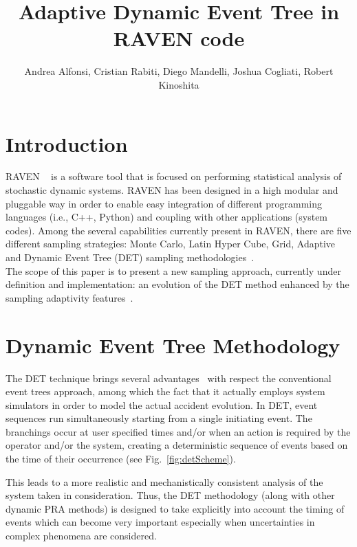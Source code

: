 \documentclass{anstrans}
\title{Adaptive Dynamic Event Tree in RAVEN code}
\author{Andrea Alfonsi, Cristian Rabiti, Diego Mandelli, Joshua Cogliati, Robert Kinoshita}
\institute{Idaho National Laboratory, 2525 Fremont Avenue, Idaho Falls, ID 83402, United States}
\begin{document}
\section{Introduction}

RAVEN ~\cite{ravenFY12,alfonsiMC,alfonsiESREL2014} is a software tool that is focused on performing statistical analysis of stochastic dynamic systems. RAVEN has been designed in a high modular and pluggable way in order to enable easy integration of different programming languages (i.e., C++, Python) and coupling with other applications (system codes). Among the several capabilities currently present in RAVEN, there are five different sampling strategies: Monte Carlo, Latin Hyper Cube, Grid, Adaptive and Dynamic Event Tree (DET) sampling methodologies~\cite{ravenFY14}. \\ The scope of this paper is to present a new sampling approach, currently under definition and implementation: an evolution of the DET method enhanced by the  sampling adaptivity features~\cite{mandelliSVMANS}.


\section{Dynamic Event Tree Methodology}
The DET technique brings several advantages~\cite{alfonsiPSA2013,ADAPTHakobyan} with respect the conventional event trees approach, among which the fact that it actually employs system simulators in order to model the actual accident evolution. In DET,  event sequences run simultaneously starting from a single initiating event. The branchings occur at user specified times and/or when an action is required by the operator and/or the system, creating a deterministic sequence of events based on the time of their occurrence (see Fig.~\ref{fig:detScheme}).

This leads to a more realistic and mechanistically consistent analysis of the system taken in consideration. Thus, the DET methodology (along with other dynamic PRA methods) is designed to take explicitly into account the timing of events which can become very important especially when uncertainties in complex phenomena are considered.
\end{document}

